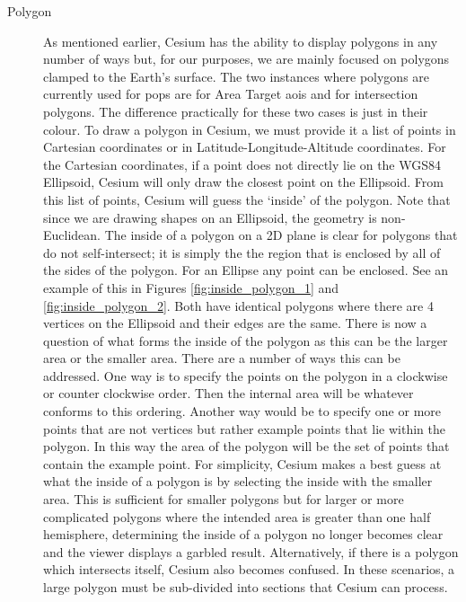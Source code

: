 \begin{description}
    \item[Polygon] As mentioned earlier, Cesium has the ability to display
	polygons in any number of ways but, for our purposes, we are mainly
	focused on polygons clamped to the Earth's surface. The two instances
	where polygons are currently used for \gls{pops} are for Area Target
	\glspl{aoi} and for intersection polygons. The difference practically
	for these two cases is just in their colour. To draw a polygon in
	Cesium, we must provide it a list of points in Cartesian coordinates or
	in Latitude-Longitude-Altitude coordinates. For the Cartesian
	coordinates, if a point does not directly lie on the WGS84 Ellipsoid,
	Cesium will only draw the closest point on the Ellipsoid. From this
	list of points, Cesium will guess the `inside' of the polygon. Note
	that since we are drawing shapes on an Ellipsoid, the geometry is
	non-Euclidean. The inside of a polygon on a 2D plane is clear for
	polygons that do not self-intersect; it is simply the the region that
	is enclosed by all of the sides of the polygon. For an Ellipse any
	point can be enclosed. See an example of this in Figures
	\ref{fig:inside_polygon_1} and \ref{fig:inside_polygon_2}. Both have
	identical polygons where there are 4 vertices on the Ellipsoid and
	their edges are the same. There is now a question of what forms the
	inside of the polygon as this can be the larger area or the smaller
	area. There are a number of ways this can be addressed. One way is to
	specify the points on the polygon in a clockwise or counter clockwise
	order. Then the internal area will be whatever conforms to this
	ordering. Another way would be to specify one or more points that are
	not vertices but rather example points that lie within the polygon. In
	this way the area of the polygon will be the set of points that contain
	the example point. For simplicity, Cesium makes a best guess at what
	the inside of a polygon is by selecting the inside with the smaller
	area. This is sufficient for smaller polygons but for larger or more
	complicated polygons where the intended area is greater than one half
	hemisphere, determining the inside of a polygon no longer becomes clear
	and the viewer displays a garbled result. Alternatively, if there is a
	polygon which intersects itself, Cesium also becomes confused. In these
	scenarios, a large polygon must be sub-divided into sections that
	Cesium can process.



\end{description}
